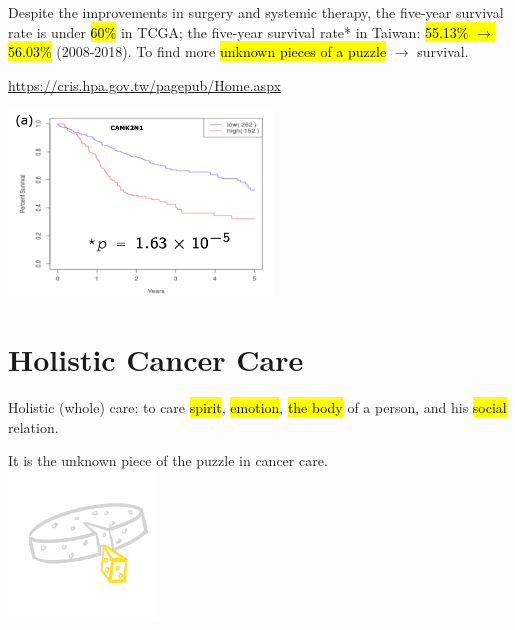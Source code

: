\documentclass[
paper=landscape,
paper=160mm:90mm, %
fontsize=11pt, %
pagesize, %
parskip=half-, %
]{scrartcl} %
\theoremstyle{mythmstyle} %
\begin{document}
\begin{minipage}[c]{0.40\linewidth}
\begin{outline}
\0
\0 Despite the improvements in surgery and systemic therapy,
        \1 the five-year survival rate is under \hl{60\%} in TCGA;
        \1 the five-year survival rate* in Taiwan: \hl{55.13\% $\longrightarrow$ 56.03\%}  (2008-2018).
\0 To find more \hl{unknown pieces of a puzzle} $\longrightarrow$ survival.
\end{outline}

    {\tiny *\url{https://cris.hpa.gov.tw/pagepub/Home.aspx}}
\end{minipage}%
\begin{minipage}[c]{0.55\linewidth}
    \raggedright
    \hfill\includegraphics[width=7cm]{KMplot_CAMK2N1.pdf}
\end{minipage}




\clearpage



\section{Holistic Cancer Care} 

\thispagestyle{headings}

Holistic (whole) care: to care \hl{spirit}, \hl{emotion}, \hl{the body} of a person, and his \hl{social} relation.

It is the unknown piece of the puzzle in cancer care.\\
\includegraphics[width=4cm]{piece.jpg}
\end{document}
